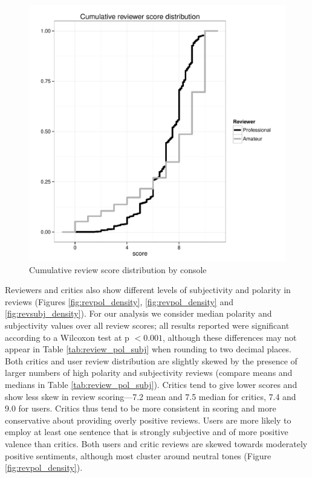 \documentclass[letterpaper]{article}
\begin{document}
\begin{figure}[tb]
\centering
\includegraphics[width=\linewidth]{./console_reviews_score_ecdf}
\caption{Cumulative review score distribution by console}
\label{fig:revscore_console}
\end{figure}


Reviewers and critics also show different levels of subjectivity and polarity in reviews (Figures \ref{fig:revpol_density}, \ref{fig:revpol_density} and \ref{fig:revsubj_density}). For our analysis we consider median polarity and subjectivity values over all review scores; all results reported were significant according to a Wilcoxon test at p $< 0.001$, although these differences may not appear in Table \ref{tab:review_pol_subj} when rounding to two decimal places. 
Both critics and user review distribution are slightly skewed by the presence of larger numbers of high polarity and subjectivity reviews (compare means and medians in Table \ref{tab:review_pol_subj}). Critics tend to give lower scores and show less skew in review scoring---7.2 mean and 7.5 median for critics, 7.4 and 9.0 for users. Critics thus tend to be more consistent in scoring and more conservative about providing overly positive reviews.
Users are more likely to employ at least one sentence that is strongly subjective and of more positive valence than critics. Both users and critic reviews are skewed towards moderately positive sentiments, although most cluster around neutral tones (Figure \ref{fig:revpol_density}). 
\end{document}
